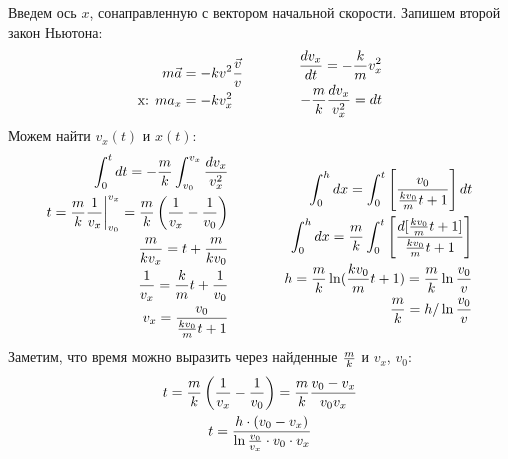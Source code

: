 \documentclass[a5paper,10pt]{article}
\begin{document}
Введем ось $x$, сонаправленную с вектором начальной скорости.
Запишем второй закон Ньютона:
\begin{equation*}
    \xdef\km{\frac{k}{m}}\xdef\mk{\frac{m}{k}}\xdef\mgk{\frac{mg}{k}}%
    \begin{aligned}[c]
        m\vec{a}&=-kv^2\frac{\vec{v}}{v}\\
        \text{x: } ma_x&=-kv^2_x\\
    \end{aligned}
        \qquad\qquad
    \begin{aligned}[c]
        \frac{dv_x}{dt}=-\km{}v^2_x\\
        -\mk\frac{dv_x}{v^2_x}=dt\\
    \end{aligned}
\end{equation*}
Можем найти $v_x(t)$ и $x(t)$:
\begin{equation*}
    \begin{aligned}[c]
        \int_0^{t}dt=-\mk\int_{v_0}^{v_x}\frac{dv_x}{v^2_x}\\
        t=\mk\frac{1}{v_x}\bigg|_{v_0}^{v_x}=\mk\left(\frac{1}{v_x}- \frac{1}{v_0}\right)\\
        \frac{m}{kv_x}=t+\frac{m}{kv_0}\\
        \frac{1}{v_x}=\km{t}+\frac{1}{v_0}\\
        v_x=\frac{v_0}{\frac{kv_0}{m}t+1}
    \end{aligned}
        \qquad\qquad
    \begin{aligned}[c]
        \int_0^{h}dx=\int_{0}^{t}\left[\frac{v_0}{\frac{kv_0}{m}t+1}\right]dt\\
        \int_0^{h}dx=\frac{m}{k}\int_{0}^{t}\left[\frac{d[\frac{kv_0}{m}t+1]}{\frac{kv_0}{m}t+1}\right]\\
        h=\mk\ln(\frac{kv_0}{m}t+1)=\mk\ln\frac{v_0}{v}\\
        \mk=h/\ln\frac{v_0}{v}
    \end{aligned}
\end{equation*}
Заметим, что время можно выразить через найденные $\mk$ и $v_x$, $v_0$:
\begin{gather*}
        t=\mk\left(\frac{1}{v_x}- \frac{1}{v_0}\right)=\mk\frac{v_0-v_x}{v_0v_x}\\
        t=\frac{h\cdot(v_0-v_x)}{\ln\frac{v_0}{v_x}\cdot{v_0}\cdot{v_x}}
\end{gather*}
\end{document}
